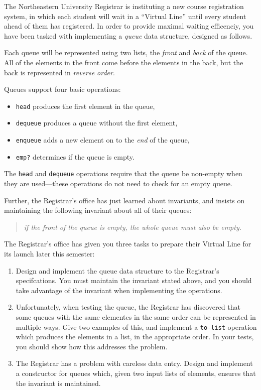 \documentclass[12pt]{article}                   %
\def\pts#1{\marginpar{\footnotesize \raggedright  \fbox{#1 {\sc Points}}}}
\begin{document}
\begin{problem} \pts{6}

The Northeastern University Registrar is instituting a new
course registration system, in which each student will wait in a
``Virtual Line'' until every student ahead of them has registered.  In
order to provide maximal waiting efficenciy, you have been tasked with
implementing a \emph{queue} data structure, designed as follows.  

Each queue will be represented using two lists, the \emph{front} and
\emph{back} of the queue.  All of the elements in the front come
before the elements in the back, but the back is represented in
\emph{reverse order}.  

Queues support four basic operations:
\begin{itemize}
\item \texttt{head} produces the first element in the queue,
\item \texttt{dequeue} produces a queue without the first element,
\item \texttt{enqueue} adds a new element on to the \emph{end} of the
  queue,
\item \texttt{emp?} determines if the queue is empty.
\end{itemize}
The \texttt{head} and \texttt{dequeue} operations require that the
queue be non-empty when they are used---these operations do not need
to check for an empty queue.

Further, the Registrar's office has just learned about invariants, and
insists on maintaining the following invariant about all of their
queues:  

\begin{quote}
  {\it if the front of the queue is empty, the whole queue must also be empty.}
\end{quote} 

\noindent
The Registrar's office has given you three tasks to prepare their
Virtual Line for its launch later this semester:

\begin{enumerate}
\item Design and implement the queue data structure to the Registrar's
  specifcations.  You must maintain the invariant stated above, and
  you should take advantage of the invariant when implementing the
  operations.
\item Unfortunately, when testing the queue, the Registrar has
  discovered that some queues with the same elementes in the same
  order can be represented in multiple ways.  Give two examples of
  this, and implement a \texttt{to-list} operation which produces the
  elements in a list, in the appropriate order.  In your tests, you
  should show how this addresses the problem.
\item The Registrar has a problem with careless data entry.  Design
  and implement a constructor for queues which, given two input lists
  of elements, ensures that the invariant is maintained.  
\end{enumerate}


\end{problem}
\end{document}
